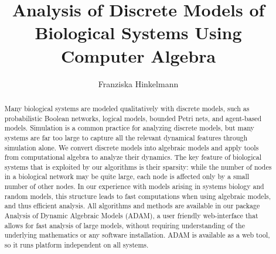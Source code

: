 \documentclass[11pt]{amsart}
\title{Analysis of Discrete Models of Biological 
Systems Using Computer Algebra}
\author{Franziska Hinkelmann}
\begin{document}
\maketitle
\begin{abstract}
Many biological systems are modeled qualitatively with discrete models,
such as probabilistic Boolean networks, logical models, bounded Petri nets,
and agent-based models.  Simulation is a common practice for analyzing
discrete models, but many systems are far too large to capture all the
relevant dynamical features through simulation alone.  
We convert discrete models into algebraic models and apply tools from computational algebra to analyze their dynamics. 
 The key feature of biological systems that is exploited by our algorithms is their sparsity: 
while the number of nodes in a biological network may be quite large, each node is affected only 
by a small number of other nodes. In our experience with models arising in systems biology and random models,
 this structure leads to fast computations when using algebraic models, and thus efficient analysis.  
All algorithms and methods are available in our package Analysis of Dynamic
Algebraic Models (ADAM), a user friendly web-interface that allows for fast
analysis of large models, without requiring understanding of the underlying
mathematics or any software installation. ADAM is available as a web tool,
so it runs platform independent on all systems.
\end{abstract}
\end{document}
